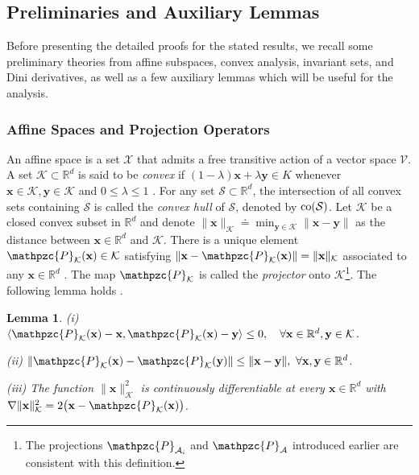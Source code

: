 \documentclass[a4paper, 11pt]{article}
\newtheorem{lemma}{Lemma}
\begin{document}
\subsection{Preliminaries and Auxiliary Lemmas}
Before presenting the detailed proofs for the stated results, we recall  some preliminary theories from  affine subspaces, convex analysis,  invariant sets, and  Dini derivatives, as well as a few auxiliary lemmas which will be useful  for the analysis.



\subsubsection{Affine Spaces and  Projection Operators}



An affine space is a set $\mathcal{X}$ that admits a free transitive action of a vector space $\mathcal{V}$. A set $\mathcal{K}\subset \mathbb{R}^d$ is said to be {\it convex} if $(1-\lambda)\mathbf{x}+\lambda
\mathbf{y}\in K$ whenever $\mathbf{x}\in \mathcal{K},\mathbf{y}\in \mathcal{K}$ and $0\leq\lambda \leq1$ \cite{rock}.
For any set $\mathcal{S}\subset \mathbb{R}^d$, the intersection of all convex sets
containing $\mathcal{S}$ is called the {\it convex hull} of $\mathcal{S}$, denoted by
${\rm co}(\mathcal{S})$. Let $\mathcal{K}$ be a closed convex subset in $\mathbb{R}^d$ and denote
$\|\mathbf{x}\|_\mathcal{K}\doteq\min_{\mathbf{y}\in \mathcal{K}} \| \mathbf{x}-\mathbf{y} \|$ as the distance between $\mathbf{x}\in \mathbb{R}^d$ and $\mathcal{K}$.  There is a unique element $\mathpzc{P}_{\mathcal{K}}(\mathbf{x})\in \mathcal{K}$ satisfying
$\|\mathbf{x}-\mathpzc{P}_{\mathcal{K}}(\mathbf{x})\|=\|\mathbf{x}\|_{\mathcal{K}}$ associated to any
$\mathbf{x}\in \mathbb{R}^d$ \cite{aubin}.  The map $\mathpzc{P}_{\mathcal{K}}$ is called the {\it projector} onto $\mathcal{K}$\footnote{The projections $\mathpzc{P}_{\mathcal{A}_i}$ and $\mathpzc{P}_{\mathcal{A}}$ introduced earlier are consistent with this definition.}. The following lemma holds  \cite{aubin}.
\begin{lemma}\label{lemconvex}
(i) $\langle\mathpzc{P}_{\mathcal{K}}(\mathbf{x})-\mathbf{x},\mathpzc{P}_{\mathcal{K}}(\mathbf{x})-\mathbf{y}\rangle\leq 0,\quad \forall  \mathbf{x}\in \mathbb{R}^d, \mathbf{y}\in
\mathcal{K}$.

(ii) $\|\mathpzc{P}_{\mathcal{K}}(\mathbf{x})-\mathpzc{P}_{\mathcal{K}}(\mathbf{y})\|\leq\|\mathbf{x}-\mathbf{y}\|, \ \forall \mathbf{x},\mathbf{y}\in \mathbb{R}^d$.

(iii)  The function $\|\mathbf{x}\|_\mathcal{K}^2$ is continuously differentiable at every $\mathbf{x}\in\mathbb{R}^d$ with $\nabla\|\mathbf{x}\|_\mathcal{K}^2=2\big(\mathbf{x}-\mathpzc{P}_{\mathcal{K}}(\mathbf{x})\big)$.
\end{lemma}
\end{document}
